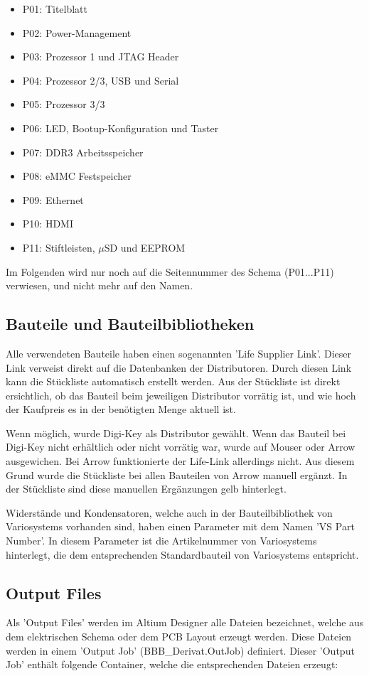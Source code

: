 \begin{itemize}
\item P01: Titelblatt
\item P02: Power-Management
\item P03: Prozessor 1 und JTAG Header
\item P04: Prozessor 2/3, USB und Serial
\item P05: Prozessor 3/3
\item P06: LED, Bootup-Konfiguration und Taster
\item P07: DDR3 Arbeitsspeicher
\item P08: eMMC Festspeicher
\item P09: Ethernet
\item P10: HDMI
\item P11: Stiftleisten, $\mu$SD und EEPROM
\end{itemize}

Im Folgenden wird nur noch auf die Seitennummer des Schema (P01...P11) verwiesen, und nicht mehr auf den Namen. 


\subsection{Bauteile und Bauteilbibliotheken}
Alle verwendeten Bauteile haben einen sogenannten 'Life Supplier Link'. Dieser Link verweist direkt auf die Datenbanken der Distributoren. Durch diesen Link kann die Stückliste automatisch erstellt werden. Aus der Stückliste ist direkt ersichtlich, ob das Bauteil beim jeweiligen Distributor vorrätig ist, und wie hoch der Kaufpreis es in der benötigten Menge aktuell ist.

Wenn möglich, wurde Digi-Key als Distributor gewählt. Wenn das Bauteil bei Digi-Key nicht erhältlich oder nicht vorrätig war, wurde auf Mouser oder Arrow ausgewichen. Bei Arrow funktionierte der Life-Link allerdings nicht. Aus diesem Grund wurde die Stückliste bei allen Bauteilen von Arrow manuell ergänzt. In der Stückliste sind diese manuellen Ergänzungen gelb hinterlegt.

Widerstände und Kondensatoren, welche auch in der Bauteilbibliothek von Variosystems vorhanden sind, haben einen Parameter mit dem Namen 'VS Part Number'. In diesem Parameter ist die Artikelnummer von Variosystems hinterlegt, die dem entsprechenden Standardbauteil von Variosystems entspricht.

\subsection{Output Files}
Als 'Output Files' werden im Altium Designer alle Dateien bezeichnet, welche aus dem elektrischen Schema oder dem PCB Layout erzeugt werden. Diese Dateien werden in einem 'Output Job' (BBB\_Derivat.OutJob) definiert. Dieser 'Output Job' enthält folgende Container, welche die entsprechenden Dateien erzeugt:

